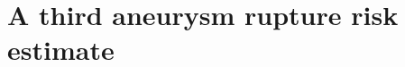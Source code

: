 \documentclass[../conclusions.tex]{subfiles}
\begin{document}
    
\section{A third aneurysm rupture risk estimate}
\end{document}
